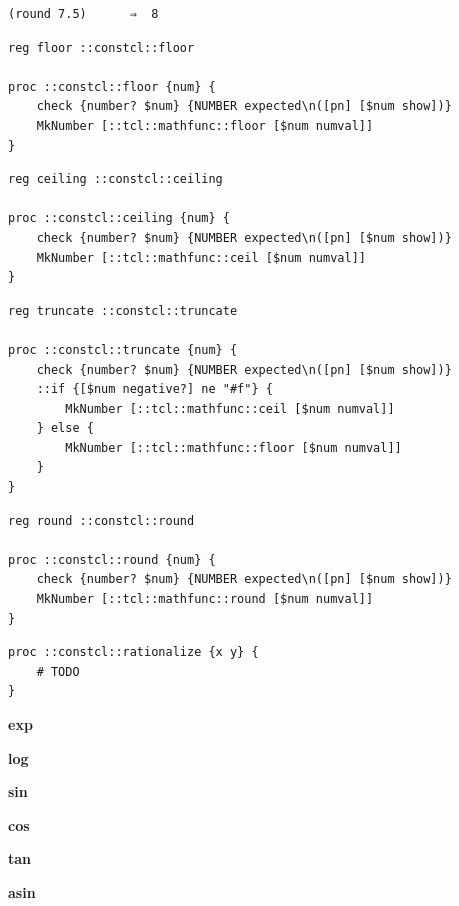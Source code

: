 \documentclass[twoside,9pt]{report}
\begin{document}
\noindent\makebox[\linewidth]{\rule{\linewidth}{0.4pt}}
\begin{lstlisting}
(round 7.5)      ⇒  8
\end{lstlisting}
\noindent\makebox[\linewidth]{\rule{\linewidth}{0.4pt}}
\noindent\makebox[\linewidth]{\rule{\linewidth}{0.4pt}}
\begin{lstlisting}
reg floor ::constcl::floor
 
proc ::constcl::floor {num} {
    check {number? $num} {NUMBER expected\n([pn] [$num show])}
    MkNumber [::tcl::mathfunc::floor [$num numval]]
}
\end{lstlisting}
\noindent\makebox[\linewidth]{\rule{\linewidth}{0.4pt}}
\noindent\makebox[\linewidth]{\rule{\linewidth}{0.4pt}}
\begin{lstlisting}
reg ceiling ::constcl::ceiling
 
proc ::constcl::ceiling {num} {
    check {number? $num} {NUMBER expected\n([pn] [$num show])}
    MkNumber [::tcl::mathfunc::ceil [$num numval]]
}
\end{lstlisting}
\noindent\makebox[\linewidth]{\rule{\linewidth}{0.4pt}}
\noindent\makebox[\linewidth]{\rule{\linewidth}{0.4pt}}
\begin{lstlisting}
reg truncate ::constcl::truncate
 
proc ::constcl::truncate {num} {
    check {number? $num} {NUMBER expected\n([pn] [$num show])}
    ::if {[$num negative?] ne "#f"} {
        MkNumber [::tcl::mathfunc::ceil [$num numval]]
    } else {
        MkNumber [::tcl::mathfunc::floor [$num numval]]
    }
}
\end{lstlisting}
\noindent\makebox[\linewidth]{\rule{\linewidth}{0.4pt}}
\noindent\makebox[\linewidth]{\rule{\linewidth}{0.4pt}}
\begin{lstlisting}
reg round ::constcl::round
 
proc ::constcl::round {num} {
    check {number? $num} {NUMBER expected\n([pn] [$num show])}
    MkNumber [::tcl::mathfunc::round [$num numval]]
}
\end{lstlisting}
\noindent\makebox[\linewidth]{\rule{\linewidth}{0.4pt}}
\noindent\makebox[\linewidth]{\rule{\linewidth}{0.4pt}}
\begin{lstlisting}
proc ::constcl::rationalize {x y} {
    # TODO
}
\end{lstlisting}
\noindent\makebox[\linewidth]{\rule{\linewidth}{0.4pt}}

\textbf{exp}


\textbf{log}


\textbf{sin}


\textbf{cos}


\textbf{tan}


\textbf{asin}
\end{document}
